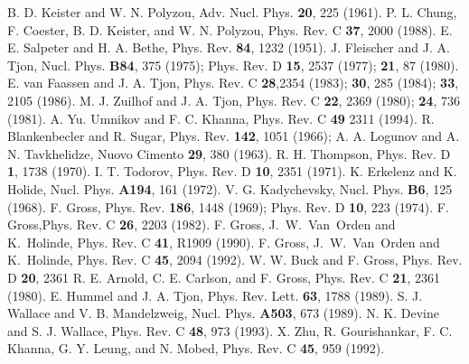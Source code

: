 \documentclass[12pt]{report}
\begin{document}
\begin{thebibliography}{Bliggs}


%
 B. D. Keister and W. N. Polyzou, Adv. Nucl.
                  Phys. {\bf 20}, 225 (1961).
%
 P. L. Chung, F. Coester, B. D. Keister, and W. N.
                 Polyzou, Phys. Rev. C {\bf 37}, 2000 (1988).
%
 E. E. Salpeter and H. A. Bethe, Phys. Rev. {\bf 84},
1232 (1951).
%
 J. Fleischer and J. A. Tjon, Nucl. Phys. {\bf B84},
375 (1975); Phys. Rev. D {\bf 15}, 2537 (1977); {\bf 21}, 87 (1980).
E. van Faassen and J. A. Tjon, Phys. Rev. C {\bf
28},2354 (1983); {\bf 30}, 285 (1984); {\bf 33}, 2105 (1986).
%
 M. J. Zuilhof and J. A. Tjon, Phys. Rev. C {\bf 22}, 2369
            (1980); {\bf 24}, 736 (1981).
%
 A. Yu. Umnikov and F. C. Khanna, Phys. Rev. C {\bf 49}
                2311 (1994).
%
 R. Blankenbecler and R. Sugar, Phys. Rev. {\bf 142}, 1051
               (1966); A. A. Logunov and A. N. Tavkhelidze, Nuovo Cimento
               {\bf 29}, 380 (1963).
%
 R. H. Thompson, Phys. Rev. D {\bf 1}, 1738 (1970).
%
 I. T. Todorov, Phys. Rev. D {\bf 10}, 2351 (1971).
%
 K. Erkelenz and K. Holide, Nucl. Phys. {\bf A194},
                  161 (1972).
%
 V. G. Kadychevsky, Nucl. Phys. {\bf B6}, 125 (1968).
%
 F. Gross, Phys. Rev. {\bf 186}, 1448 (1969); Phys. Rev. D  {\bf 10},
               223 (1974).
%
 F. Gross,Phys. Rev. C {\bf 26}, 2203 (1982).
%
 F. Gross, J.~W.~Van~Orden and K.~Holinde, Phys. Rev. C {\bf 41},
                R1909 (1990).
%
 F. Gross, J.~W.~Van~Orden and K.~Holinde, Phys. Rev. C {\bf 45},
                 2094 (1992).
%
 W. W. Buck and F. Gross, Phys. Rev. D {\bf 20}, 2361
%
 R. E. Arnold, C. E. Carlson, and F. Gross, Phys. Rev. C
                   {\bf21}, 2361 (1980).
%
 E. Hummel and J. A. Tjon, Phys. Rev. Lett. {\bf 63},
1788 (1989).
%
 S. J. Wallace and V. B. Mandelzweig, Nucl. Phys.
                     {\bf A503}, 673 (1989).
%
 N. K. Devine and S. J. Wallace, Phys. Rev. C {\bf 48}, 973
                     (1993).
%
 X. Zhu, R. Gourishankar, F. C. Khanna, G. Y. Leung, and
              N. Mobed, Phys. Rev. C {\bf 45}, 959 (1992).

\end{thebibliography}
\end{document}
